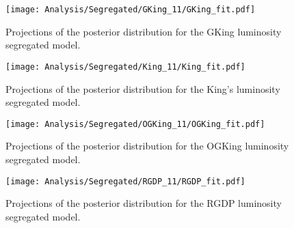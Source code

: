 \begin {figure}
 \centering
 \texttt{[image: Analysis/Segregated/GKing\_11/GKing\_fit.pdf]}
  \caption{Projections of the posterior distribution for the GKing luminosity segregated model.}
\label{fig:GKingSeg}
\end {figure}

\begin {figure}
 \centering
 \texttt{[image: Analysis/Segregated/King\_11/King\_fit.pdf]}
  \caption{Projections of the posterior distribution for the King's luminosity segregated model.}
\label{fig:KingSeg}
\end {figure}

\begin {figure}
 \centering
 \texttt{[image: Analysis/Segregated/OGKing\_11/OGKing\_fit.pdf]}
  \caption{Projections of the posterior distribution for the OGKing luminosity segregated model.}
\label{fig:OGKingSeg}
\end {figure}

\begin {figure}
 \centering
 \texttt{[image: Analysis/Segregated/RGDP\_11/RGDP\_fit.pdf]}
  \caption{Projections of the posterior distribution for the RGDP luminosity segregated model.}
\label{fig:RGDPSeg}
\end {figure}

